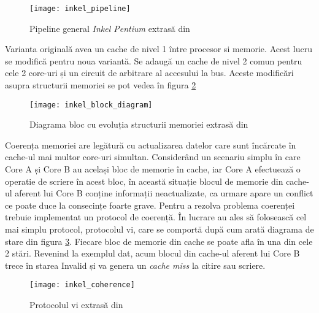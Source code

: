\documentclass[../main.tex]{subfiles}
\begin{document}
\begin{figure}[h]
    \centering
    \texttt{[image: inkel\_pipeline]}
    \caption{Pipeline general \emph{Inkel Pentium} extrasă din \cite{inkel}}
    \label{fig:inkel_pipeline}
\end{figure}

Varianta originală avea un cache de nivel 1 între procesor si memorie. Acest lucru se modifică pentru noua variantă.
Se adaugă un cache de nivel 2 comun pentru cele 2 core-uri și un circuit de arbitrare al accesului la bus. Aceste
modificări asupra structurii memoriei se pot vedea în figura \ref{fig:inkel_block_diagram}

\begin{figure}[h]
    \centering
    \texttt{[image: inkel\_block\_diagram]}
    \caption{Diagrama bloc cu evoluția structurii memoriei extrasă din \cite{inkel}}
    \label{fig:inkel_block_diagram}
\end{figure}

Coerența memoriei are legătură cu actualizarea datelor care sunt încărcate în cache-ul mai multor core-uri simultan.
Considerând un scenariu simplu în care Core A și Core B au același bloc de memorie în cache, iar Core A efectuează o
operatie de scriere în acest bloc, în această situație blocul de memorie din cache-ul aferent lui Core B conține informații
neactualizate, ca urmare apare un conflict ce poate duce la consecințe foarte grave. Pentru a rezolva problema coerenței
trebuie implementat un protocol de coerență. În lucrare au ales să folosească cel mai simplu protocol, protocolul \acrfull{vi},
care se comportă după cum arată diagrama de stare din figura \ref{fig:inkel_coherence}. Fiecare bloc de memorie din cache
se poate afla în una din cele 2 stări. Revenind la exemplul dat, acum blocul din cache-ul aferent lui Core B trece în
starea Invalid și va genera un \emph{cache miss} la citire sau scriere.

\begin{figure}[h]
    \centering
    \texttt{[image: inkel\_coherence]}
    \caption{Protocolul \acrshort{vi} extrasă din \cite{inkel}}
    \label{fig:inkel_coherence}
\end{figure}
\end{document}
